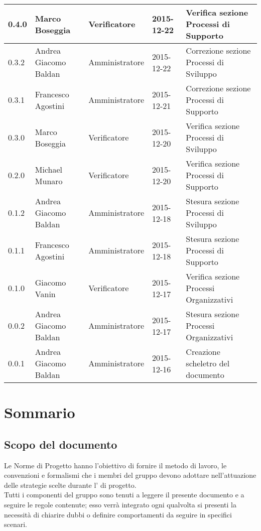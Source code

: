 \documentclass{scalatekids-article}
\begin{document}
\begin{center}
\begin{longtable}{| l | l | l | l | p{5cm} |}
    \hline
    0.4.0 & Marco Boseggia & Verificatore & 2015-12-22 & Verifica sezione Processi di Supporto\\
    \hline
    0.3.2 & Andrea Giacomo Baldan & Amministratore & 2015-12-22 & Correzione sezione Processi di Sviluppo\\
    \hline
    0.3.1 & Francesco Agostini & Amministratore & 2015-12-21 & Correzione sezione Processi di Supporto\\
    \hline
    0.3.0 & Marco Boseggia & Verificatore & 2015-12-20 & Verifica sezione Processi di Sviluppo\\
    \hline
    0.2.0 & Michael Munaro & Verificatore & 2015-12-20 & Verifica sezione Processi di Supporto\\
    \hline
    0.1.2 & Andrea Giacomo Baldan & Amministratore & 2015-12-18 & Stesura sezione Processi di Sviluppo\\
    \hline
    0.1.1 & Francesco Agostini & Amministratore & 2015-12-18 & Stesura sezione Processi di Supporto\\
    \hline
    0.1.0 & Giacomo Vanin & Verificatore & 2015-12-17 & Verifica sezione Processi Organizzativi\\
    \hline
    0.0.2 & Andrea Giacomo Baldan & Amministratore & 2015-12-17 & Stesura sezione Processi Organizzativi\\
    \hline
    0.0.1 & Andrea Giacomo Baldan & Amministratore & 2015-12-16 & Creazione scheletro del documento\\
    \hline
  \end{longtable}
\end{center}
\tableofcontents
\newpage
{}

\section{Sommario}

\subsection{Scopo del documento}

Le Norme di Progetto hanno l'obiettivo di fornire il metodo di lavoro, le
convenzioni e formalismi che i membri del gruppo devono adottare nell'attuazione
delle strategie scelte durante l' di progetto. \\
Tutti i componenti del gruppo sono tenuti a leggere il presente documento e a seguire
le regole contenute; esso verrà integrato ogni qualvolta si presenti la necessità di
chiarire dubbi o definire comportamenti da seguire in specifici scenari.
\end{document}
